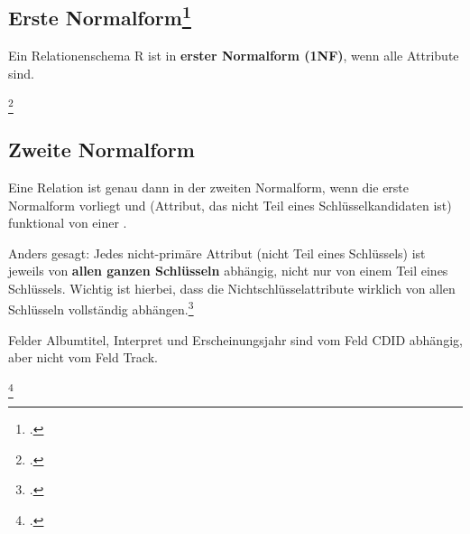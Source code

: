 \documentclass{bschlangaul-theorie}
\begin{document}
\subsection{Erste Normalform\footcite[Seite 195]{winter}}

Ein Relationenschema R ist in \textbf{erster Normalform (1NF)}, wenn
alle Attribute  sind.




\footcite{wiki:normalisierung}

%

\subsection{Zweite Normalform}

Eine Relation ist genau dann in der zweiten Normalform, wenn die erste
Normalform vorliegt und  (Attribut, das
nicht Teil eines Schlüsselkandidaten ist) funktional von einer
.

Anders gesagt: Jedes nicht-primäre Attribut (nicht Teil eines
Schlüssels) ist jeweils von \textbf{allen ganzen Schlüsseln} abhängig,
nicht nur von einem Teil eines Schlüssels. Wichtig ist hierbei, dass die
Nichtschlüsselattribute wirklich von allen Schlüsseln vollständig
abhängen.\footcite[Zweite Normalform (2NF)]{wiki:normalisierung}



Felder Albumtitel, Interpret und Erscheinungsjahr sind vom Feld CDID
abhängig, aber nicht vom Feld Track.



\footcite{wiki:normalisierung}

%
\end{document}

